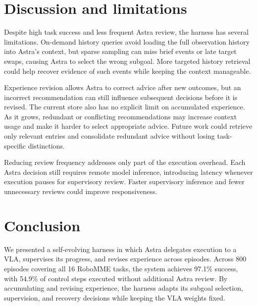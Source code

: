 \FloatBarrier
\section{Discussion and limitations}

Despite high task success and less frequent Astra review, the harness has several limitations. On-demand history queries avoid loading the full observation history into Astra's context, but sparse sampling can miss brief events or late target swaps, causing Astra to select the wrong subgoal. More targeted history retrieval could help recover evidence of such events while keeping the context manageable.

Experience revision allows Astra to correct advice after new outcomes, but an incorrect recommendation can still influence subsequent decisions before it is revised. The current store also has no explicit limit on accumulated experience. As it grows, redundant or conflicting recommendations may increase context usage and make it harder to select appropriate advice. Future work could retrieve only relevant entries and consolidate redundant advice without losing task-specific distinctions.

Reducing review frequency addresses only part of the execution overhead. Each Astra decision still requires remote model inference, introducing latency whenever execution pauses for supervisory review. Faster supervisory inference and fewer unnecessary reviews could improve responsiveness.

\section{Conclusion}

We presented a self-evolving harness in which Astra delegates execution to a VLA, supervises its progress, and revises experience across episodes. Across 800 episodes covering all 16 RoboMME tasks, the system achieves 97.1\% success, with 54.9\% of control steps executed without additional Astra review. By accumulating and revising experience, the harness adapts its subgoal selection, supervision, and recovery decisions while keeping the VLA weights fixed.



